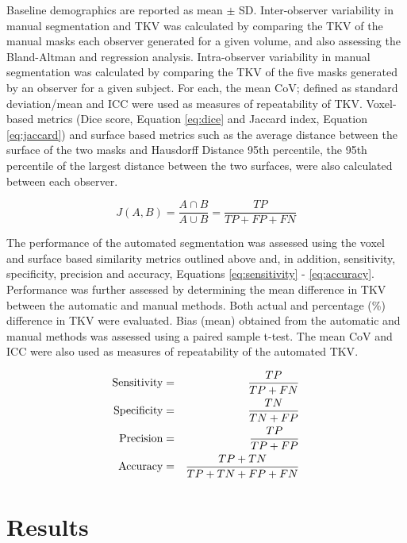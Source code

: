 Baseline demographics are reported as mean $\pm$ \ac{SD}. Inter-observer variability in manual segmentation and \ac{TKV} was calculated by comparing the \ac{TKV} of the manual masks each observer generated for a given volume, and also assessing the Bland-Altman and regression analysis. Intra-observer variability in manual segmentation was calculated by comparing the \ac{TKV} of the five masks generated by an observer for a given subject. For each, the mean \ac{CoV}; defined as standard deviation/mean and \ac{ICC} were used as measures of repeatability of \ac{TKV}. Voxel-based metrics (Dice score, Equation \eqref{eq:dice} and Jaccard index, Equation \eqref{eq:jaccard}) and surface based metrics such as the average distance between the surface of the two masks and Hausdorff Distance 95th percentile, the 95th percentile of the largest distance between the two surfaces, were also calculated between each observer.

\begin{equation}
	J(A,B) = \frac{A\cap B}{A\cup B} = \frac{TP}{TP+FP+FN}
	\label{eq:jaccard}
\end{equation}
	
The performance of the automated segmentation was assessed using the voxel and surface based similarity metrics outlined above and, in addition, sensitivity, specificity, precision and accuracy, Equations \eqref{eq:sensitivity} - \eqref{eq:accuracy}. Performance was further assessed by determining the mean difference in \ac{TKV} between the automatic and manual methods. Both actual and percentage (\%) difference in \ac{TKV} were evaluated. Bias (mean) obtained from the automatic and manual methods was assessed using a paired sample t-test. The mean \ac{CoV} and \ac{ICC} were also used as measures of repeatability of the automated \ac{TKV}.

\begin{eqnarray}
	\textup{Sensitivity} &=& \frac{TP}{TP + FN}
	\label{eq:sensitivity}\\
	\textup{Specificity} &=& \frac{TN}{TN + FP}
	\label{eq:specificity}\\
	\textup{Precision} &=& \frac{TP}{TP + FP}
	\label{eq:precision}\\
	\textup{Accuracy} &=& \frac{TP + TN}{TP + TN + FP + FN}
	\label{eq:accuracy}
\end{eqnarray}

\newpage
\section{Results}


